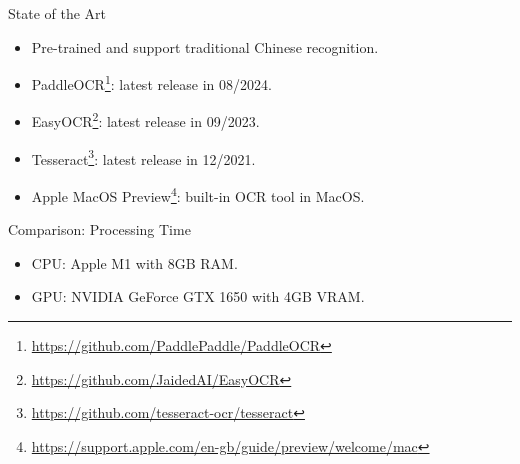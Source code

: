 \documentclass{beamer}
\begin{document}
\begin{frame}
    \begin{center}
        \Large{State of the Art}
    \end{center}
    \begin{itemize}
        \item Pre-trained and support traditional Chinese recognition.
        \item PaddleOCR\footnote{\url{https://github.com/PaddlePaddle/PaddleOCR}}: latest release in 08/2024.
        \item EasyOCR\footnote{\url{https://github.com/JaidedAI/EasyOCR}}: latest release in 09/2023.
        \item Tesseract\footnote{\url{https://github.com/tesseract-ocr/tesseract}}: latest release in 12/2021.
        \item Apple MacOS Preview\footnote{\url{https://support.apple.com/en-gb/guide/preview/welcome/mac}}: built-in OCR tool in MacOS.
    \end{itemize}
\end{frame}

\begin{frame}
    \begin{center}
        \Large{Comparison: Processing Time}
    \end{center}
    \begin{itemize}
        \item CPU: Apple M1 with 8GB RAM.
        \item GPU: NVIDIA GeForce GTX 1650 with 4GB VRAM.
    \end{itemize}
    \begin{table}[htbp]
        \centering
        \label{table:ocr_times}
    \end{table}
\end{frame}
\end{document}
